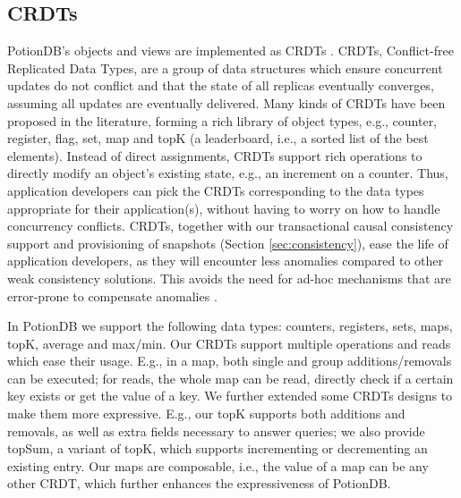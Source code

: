 \documentclass[sigplan,10pt]{acmart}
\newcommand{\carla}[1]{\nbnote{Carla}{green}{#1}}
\begin{document}
\subsection{CRDTs}
\label{subsec:CRDTs}

PotionDB's objects and views are implemented as CRDTs \cite{crdt}.
CRDTs, Conflict-free Replicated Data Types, are a group of data structures which ensure concurrent updates do not conflict and that the state of all replicas eventually converges, assuming all updates are eventually delivered.
Many kinds of CRDTs have been proposed in the literature, forming a rich library of object types, e.g., counter, register, flag, set, map and topK (a leaderboard, i.e., a sorted list of the best elements). %
Instead of direct assignments, CRDTs support rich operations to directly modify an object’s existing state, e.g., an increment on a counter.
Thus, application developers can pick the CRDTs corresponding to the data types appropriate for their application(s), without having to worry on how to handle concurrency conflicts.
CRDTs, together with our transactional causal consistency support and provisioning of snapshots (Section \ref{sec:consistency}), ease the life of application developers, as they will encounter less anomalies compared to other weak consistency solutions.
This avoids the need for ad-hoc mechanisms that are error-prone to compensate anomalies \cite{bayou, coda, ficus, thomas1979majority}. %

In PotionDB we support the following data types: counters, registers, sets, maps, topK, average and max/min.
Our CRDTs support multiple operations and reads which ease their usage. 
E.g., in a map, both single and group additions/removals can be executed; for reads, the whole map can be read, directly check if a certain key exists or get the value of a key.
We further extended some CRDTs designs to make them more expressive.
E.g., our topK supports both additions and removals, as well as extra fields necessary to answer queries; we also provide topSum, a variant of topK, which supports incrementing or decrementing an existing entry.
Our maps are composable, i.e., the value of a map can be any other CRDT, which further enhances the expressiveness of PotionDB.
\end{document}
